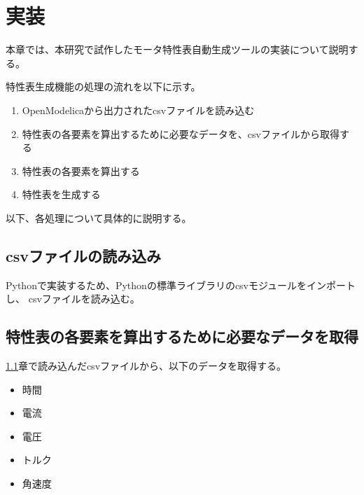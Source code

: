 \chapter{実装}\label{cha:Implementation}

本章では、本研究で試作したモータ特性表自動生成ツールの実装について説明する。




特性表生成機能の処理の流れを以下に示す。
\begin{enumerate}
    \item OpenModelicaから出力されたcsvファイルを読み込む
    \item 特性表の各要素を算出するために必要なデータを、csvファイルから取得する
    \item 特性表の各要素を算出する
    \item 特性表を生成する
\end{enumerate}

以下、各処理について具体的に説明する。

\section{csvファイルの読み込み}\label{csvfairu}
Pythonで実装するため、Pythonの標準ライブラリのcsvモジュールをインポートし、
csvファイルを読み込む。

\section{特性表の各要素を算出するために必要なデータを取得}\label{syutoku_data}
\ref{csvfairu}章で読み込んだcsvファイルから、以下のデータを取得する。

\begin{itemize}
    \item 時間
    \item 電流
    \item 電圧
    \item トルク
    \item 角速度
\end{itemize}

